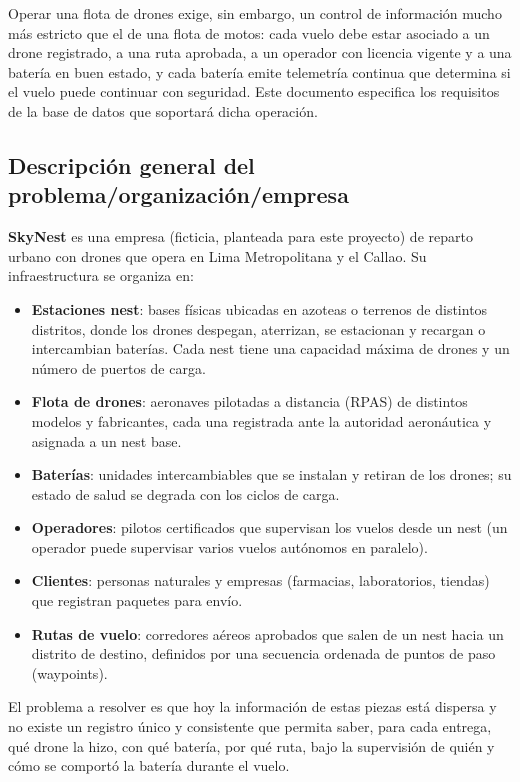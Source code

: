 \documentclass[11pt,a4paper]{article}
\begin{document}
Operar una flota de drones exige, sin embargo, un control de información mucho más estricto que el de una flota de motos: cada vuelo debe estar asociado a un drone registrado, a una ruta aprobada, a un operador con licencia vigente y a una batería en buen estado, y cada batería emite telemetría continua que determina si el vuelo puede continuar con seguridad. Este documento especifica los requisitos de la base de datos que soportará dicha operación.

\subsection{Descripción general del problema/organización/empresa}
\textbf{SkyNest} es una empresa (ficticia, planteada para este proyecto) de reparto urbano con drones que opera en Lima Metropolitana y el Callao. Su infraestructura se organiza en:

\begin{itemize}
\item \textbf{Estaciones nest}: bases físicas ubicadas en azoteas o terrenos de distintos distritos, donde los drones despegan, aterrizan, se estacionan y recargan o intercambian baterías. Cada nest tiene una capacidad máxima de drones y un número de puertos de carga.
\item \textbf{Flota de drones}: aeronaves pilotadas a distancia (RPAS) de distintos modelos y fabricantes, cada una registrada ante la autoridad aeronáutica y asignada a un nest base.
\item \textbf{Baterías}: unidades intercambiables que se instalan y retiran de los drones; su estado de salud se degrada con los ciclos de carga.
\item \textbf{Operadores}: pilotos certificados que supervisan los vuelos desde un nest (un operador puede supervisar varios vuelos autónomos en paralelo).
\item \textbf{Clientes}: personas naturales y empresas (farmacias, laboratorios, tiendas) que registran paquetes para envío.
\item \textbf{Rutas de vuelo}: corredores aéreos aprobados que salen de un nest hacia un distrito de destino, definidos por una secuencia ordenada de puntos de paso (waypoints).
\end{itemize}

El problema a resolver es que hoy la información de estas piezas está dispersa y no existe un registro único y consistente que permita saber, para cada entrega, qué drone la hizo, con qué batería, por qué ruta, bajo la supervisión de quién y cómo se comportó la batería durante el vuelo.
\end{document}
